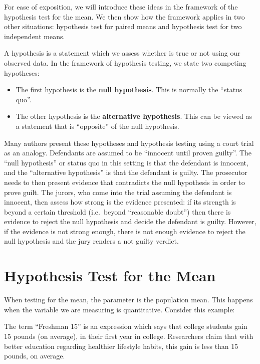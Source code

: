 \documentclass[
]{book}
\theoremstyle{definition}
\theoremstyle{definition}
\theoremstyle{definition}
\theoremstyle{definition}
\theoremstyle{remark}
\begin{document}
For ease of exposition, we will introduce these ideas in the framework of the hypothesis test for the mean. We then show how the framework applies in two other situations: hypothesis test for paired means and hypothesis test for two independent means.

A hypothesis is a statement which we assess whether is true or not using our observed data. In the framework of hypothesis testing, we state two competing hypotheses:

\begin{itemize}
\item
  The first hypothesis is the \textbf{null hypothesis}. This is normally the ``status quo''.
\item
  The other hypothesis is the \textbf{alternative hypothesis}. This can be viewed as a statement that is ``opposite'' of the null hypothesis.
\end{itemize}

Many authors present these hypotheses and hypothesis testing using a court trial as an analogy. Defendants are assumed to be ``innocent until proven guilty''. The ``null hypothesis'' or status quo in this setting is that the defendant is innocent, and the ``alternative hypothesis'' is that the defendant is guilty. The prosecutor needs to then present evidence that contradicts the null hypothesis in order to prove guilt. The jurors, who come into the trial assuming the defendant is innocent, then assess how strong is the evidence presented: if its strength is beyond a certain threshold (i.e.~beyond ``reasonable doubt'') then there is evidence to reject the null hypothesis and decide the defendant is guilty. However, if the evidence is not strong enough, there is not enough evidence to reject the null hypothesis and the jury renders a not guilty verdict.

\hypertarget{testmean}{%
\section{Hypothesis Test for the Mean}\label{testmean}}

When testing for the mean, the parameter is the population mean. This happens when the variable we are measuring is quantitative. Consider this example:

The term ``Freshman 15'' is an expression which says that college students gain 15 pounds (on average), in their first year in college. Researchers claim that with better education regarding healthier lifestyle habits, this gain is less than 15 pounds, on average.
\end{document}
